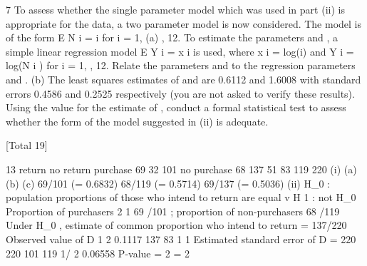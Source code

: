 \documentclass[a4paper,12pt]{article}
\begin{document}
7
To assess whether the single parameter model which was used in part (ii) is appropriate for the data, a two parameter model is now considered. The model
is of the form
E N i = i
for i = 1,
(a)
, 12.
To estimate the parameters and , a simple linear regression model
E Y i =
x i
is used, where x i = log(i) and Y i = log(N i ) for i = 1, , 12. Relate the parameters and to the regression parameters and .
(b)
The least squares estimates of and are 0.6112 and 1.6008 with standard errors 0.4586 and 0.2525 respectively (you are not asked to verify these results). Using the value for the estimate of , conduct a formal statistical test to assess whether the form of the model suggested in (ii) is adequate.

[Total 19]
\newpage

13
return
no return
purchase
69
32
101
no purchase
68
137
51
83
119
220
(i) (a)
(b)
(c)
69/101 (= 0.6832)
68/119 (= 0.5714)
69/137 (= 0.5036)
(ii) H_0 : population proportions of those who intend to return are equal
v H 1 : not H_0
Proportion of purchasers
2
1
69 /101 ; proportion of non-purchasers
68 /119
Under H_0 , estimate of common proportion who intend to return = 137/220
Observed value of D
1
2
0.1117
137 83 1
1
Estimated standard error of D =
220 220 101 119
1/ 2
0.06558
P-value = 2
= 2
\end{document}
